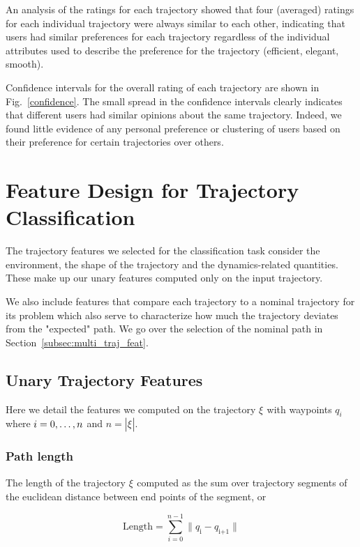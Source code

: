 \documentclass[letterpaper, 10 pt, conference]{ieeeconf}  %
\newcommand{\tj}[1]{\ensuremath{\xi_\text{#1}}}
\begin{document}
An analysis of the ratings for each trajectory showed that four (averaged) ratings for each individual trajectory were always similar to each other, indicating that users had similar preferences for each trajectory regardless of the individual attributes used to describe the preference for the trajectory (efficient, elegant, smooth). 

Confidence intervals for the overall rating of each trajectory are shown in Fig.~\ref{confidence}. The small spread in the confidence intervals clearly indicates that different users had similar opinions about the same trajectory. Indeed, we found little evidence of any personal preference or clustering of users based on their preference for certain trajectories over others. 

\section{Feature Design for Trajectory Classification}

The trajectory features we selected for the classification task consider the environment, the shape of the trajectory and the dynamics-related quantities. These make up our unary features computed only on the input trajectory. 

We also include features that compare each trajectory to a nominal trajectory for its problem which also serve to characterize how much the trajectory deviates from the "expected" path. We go over the selection of the nominal path in Section~\ref{subsec:multi_traj_feat}.

\subsection{Unary Trajectory Features}

Here we detail the features we computed on the trajectory \tj{} with waypoints $q_i$ where $i={0,\mathellipsis,n}$ and $n=|\tj{}|$.

\subsubsection{Path length}

The length of the trajectory \tj{} computed as the sum over trajectory segments of the euclidean distance between end points of the segment, or

\begin{equation}
\text{Length} = \sum_{i=0}^{n-1} \| q_\text{i}-q_\text{i+1} \|
\end{equation}
\end{document}
